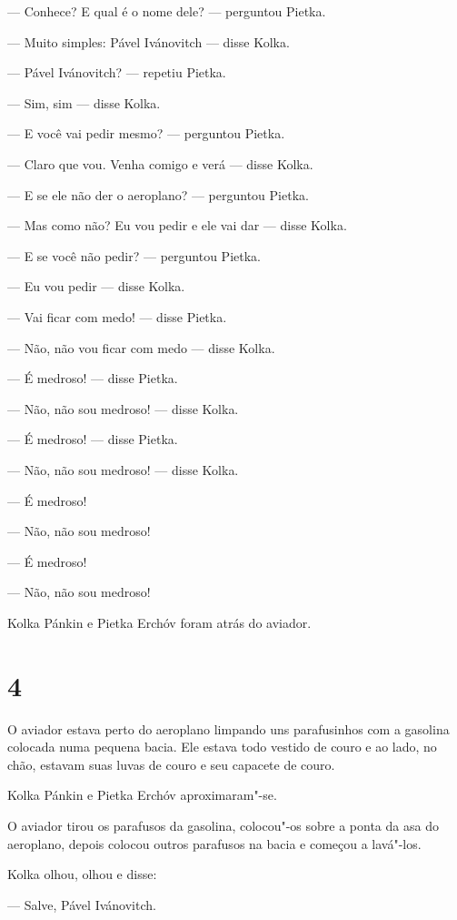 --- Conhece? E qual é o nome dele? --- perguntou Pietka.

--- Muito simples: Pável Ivánovitch --- disse Kolka.

--- Pável Ivánovitch? --- repetiu Pietka.

--- Sim, sim --- disse Kolka.

--- E você vai pedir mesmo? --- perguntou Pietka.

--- Claro que vou. Venha comigo e verá --- disse Kolka.

--- E se ele não der o aeroplano? --- perguntou Pietka.

--- Mas como não? Eu vou pedir e ele vai dar --- disse Kolka.

--- E se você não pedir? --- perguntou Pietka.

--- Eu vou pedir --- disse Kolka.

--- Vai ficar com medo! --- disse Pietka.

--- Não, não vou ficar com medo --- disse Kolka.

--- É medroso! --- disse Pietka.

--- Não, não sou medroso! --- disse Kolka.

--- É medroso! --- disse Pietka.

--- Não, não sou medroso! --- disse Kolka.

--- É medroso!

--- Não, não sou medroso!

--- É medroso!

--- Não, não sou medroso!

Kolka Pánkin e Pietka Erchóv foram atrás do aviador.

\section{4}

O aviador estava perto do aeroplano limpando uns parafusinhos com a
gasolina colocada numa pequena bacia. Ele estava todo vestido de couro
e ao lado, no chão, estavam suas luvas de couro e seu capacete de couro.

Kolka Pánkin e Pietka Erchóv aproximaram"-se.

O aviador tirou os parafusos da gasolina, colocou"-os sobre a ponta da
asa do aeroplano, depois colocou outros parafusos na bacia e começou a
lavá"-los.

Kolka olhou, olhou e disse:

--- Salve, Pável Ivánovitch.

